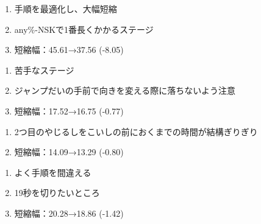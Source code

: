\begin{enumerate}[label={\sarrow}]
\item 手順を最適化し、大幅短縮
\item any\%-NSKで1番長くかかるステージ
\item 短縮幅：45.61→37.56 (-8.05)
\end{enumerate}



\begin{enumerate}[label={\sarrow}]
\item 苦手なステージ
\item ジャンプだいの手前で向きを変える際に落ちないよう注意
\item 短縮幅：17.52→16.75 (-0.77)
\end{enumerate}



\begin{enumerate}[label={\sarrow}]
\item 2つ目のやじるしをこいしの前におくまでの時間が結構ぎりぎり
\item 短縮幅：14.09→13.29 (-0.80)
\end{enumerate}



\begin{enumerate}[label={\sarrow}]
\item よく手順を間違える
\item 19秒を切りたいところ
\item 短縮幅：20.28→18.86 (-1.42)
\end{enumerate}



